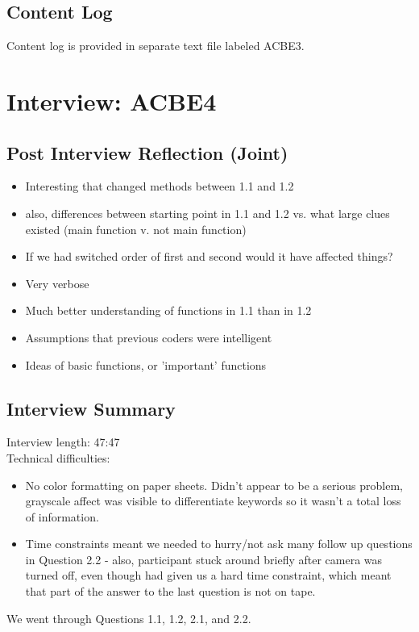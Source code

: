 \documentclass{article}
\begin{document}
\subsection{Content Log}
Content log is provided in separate text file labeled ACBE3.

\newpage
\section{Interview: ACBE4}
\subsection{Post Interview Reflection (Joint)}
\begin{itemize}
  \item Interesting that changed methods between 1.1 and 1.2
  \item also, differences between starting point in 1.1 and 1.2 vs. what large clues existed (main function v. not main function)
  \item If we had switched order of first and second would it have affected things?
  \item Very verbose
  \item Much better understanding of functions in 1.1 than in 1.2
  \item Assumptions that previous coders were intelligent
  \item Ideas of basic functions, or 'important' functions
\end{itemize}
\subsection{Interview Summary}
Interview length:  47:47 \\
Technical difficulties:
\begin{itemize}
  \item No color formatting on paper sheets. Didn't appear to be a serious problem, grayscale affect was visible to differentiate keywords so it wasn't a total loss of information.
  \item Time constraints meant we needed to hurry/not ask many follow up questions in Question 2.2 - also, participant stuck around briefly after camera was turned off, even though had given us a hard time constraint, which meant that part of the answer to the last question is not on tape.
\end{itemize}
We went through Questions 1.1, 1.2, 2.1, and 2.2.
\end{document}
